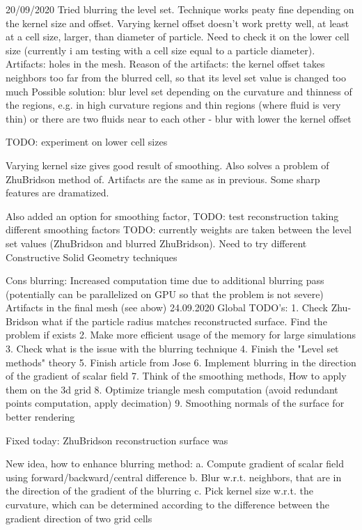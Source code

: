 20/09/2020
Tried blurring the level set. Technique works peaty fine depending on the kernel size and offset.
Varying kernel offset doesn't work pretty well, at least at a cell size, larger, than diameter of particle. 
Need to check it on the lower cell size (currently i am testing with a cell size equal to a particle diameter).
Artifacts: holes in the mesh.
Reason of the artifacts: the kernel offset takes neighbors too far from the blurred cell, so that its level set value is changed too much
Possible solution: blur level set depending on the curvature and thinness of the regions, e.g. in 
	high curvature regions and thin regions (where fluid is very thin) or there are two fluids near to each other - blur with lower the kernel offset

TODO: experiment on lower cell sizes

Varying kernel size gives good result of smoothing. Also solves a problem of ZhuBridson method of. Artifacts are the same as in previous. 
Some sharp features are dramatized.

Also added an option for smoothing factor, 
TODO: test reconstruction taking different smoothing factors
TODO: currently weights are taken between the level set values (ZhuBridson and blurred ZhuBridson). Need to try different Constructive Solid Geometry techniques

Cons blurring: Increased computation time due to additional blurring pass (potentially can be parallelized on GPU so that the problem is not severe)
				Artifacts in the final mesh (see abow)
24.09.2020
Global TODO's:
1. Check Zhu-Bridson what if the particle radius matches reconstructed surface. Find the problem if exists
2. Make more efficient usage of the memory for large simulations
3. Check what is the issue with the blurring technique
4. Finish the "Level set methods" theory
5. Finish article from Jose
6. Implement blurring in the direction of the gradient of scalar field
7. Think of the smoothing methods, How to apply them on the 3d grid
8. Optimize triangle mesh computation (avoid redundant points computation, apply decimation)
9. Smoothing normals of the surface for better rendering

Fixed today:
ZhuBridson reconstruction surface was 

New idea, how to enhance blurring method:
	a. Compute gradient of scalar field using forward/backward/central difference
	b. Blur w.r.t. neighbors, that are in the direction of the gradient of the blurring
	c. Pick kernel size w.r.t. the curvature, which can be determined according to the difference between the gradient direction of two grid cells
